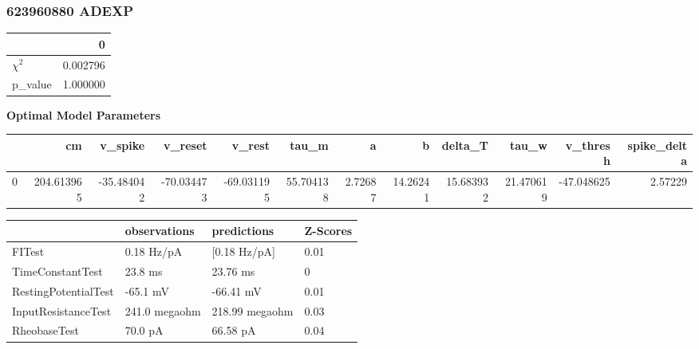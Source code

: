 \subsubsection{623960880 ADEXP}\begin{tabular}{lr}
\toprule
{} &         0 \\
\midrule
$\chi^{2}$ &  0.002796 \\
p\_value    &  1.000000 \\
\bottomrule
\end{tabular}
\textbf{Optimal Model Parameters} \begin{tabular}{lrrrrrrrrrrr}
\toprule
{} &          cm &    v\_spike &    v\_reset &     v\_rest &      tau\_m &        a &         b &    delta\_T &      tau\_w &   v\_thresh &  spike\_delta \\
\midrule
0 &  204.613965 & -35.484042 & -70.034473 & -69.031195 &  55.704138 &  2.72687 &  14.26241 &  15.683932 &  21.470619 & -47.048625 &      2.57229 \\
\bottomrule
\end{tabular}
\begin{tabular}{llll}
\toprule
{} &   observations &     predictions & Z-Scores \\
\midrule
FITest               &     0.18 Hz/pA &    [0.18 Hz/pA] &     0.01 \\
TimeConstantTest     &        23.8 ms &        23.76 ms &        0 \\
RestingPotentialTest &       -65.1 mV &       -66.41 mV &     0.01 \\
InputResistanceTest  &  241.0 megaohm &  218.99 megaohm &     0.03 \\
RheobaseTest         &        70.0 pA &        66.58 pA &     0.04 \\
\bottomrule
\end{tabular}

